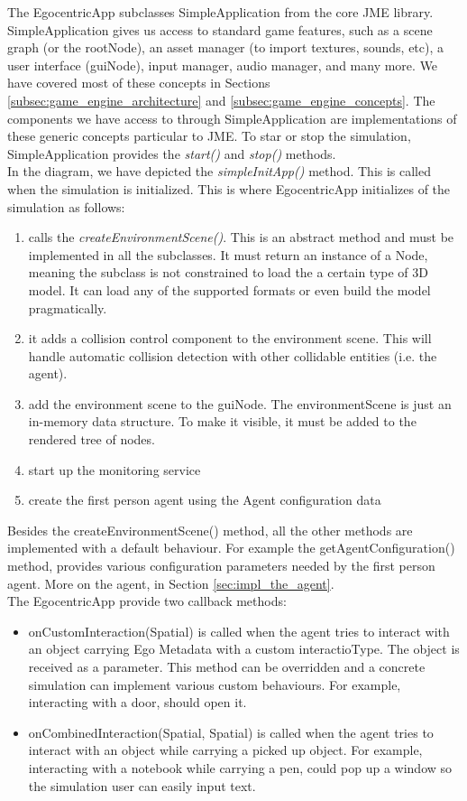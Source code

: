 The EgocentricApp subclasses SimpleApplication from the core JME library.  SimpleApplication  gives us access to standard game features, such as a scene graph (or the rootNode), an asset manager (to import textures, sounds, etc), a user interface (guiNode), input manager, audio manager, and many more. We have covered most of these concepts in Sections \ref{subsec:game_engine_architecture} and \ref{subsec:game_engine_concepts}. The components we have access to through SimpleApplication are implementations of these generic concepts particular to JME. To star or stop the simulation, SimpleApplication provides the \emph{start()} and \emph{stop()} methods.\\

In the diagram, we have depicted the \emph{simpleInitApp()} method. This is called when the simulation is initialized. This is where EgocentricApp initializes of the simulation as follows:
\begin{enumerate}
	\item calls the \emph{createEnvironmentScene()}. This is an abstract method and must be implemented in all the subclasses. It must return an instance of a Node, meaning the subclass is not constrained to load the a certain type of 3D model. It can load any of the supported formats or even build the model pragmatically.
	\item it adds a collision control component to the environment scene. This will handle automatic collision detection with other collidable entities (i.e. the agent).
	\item add the environment scene to the guiNode. The environmentScene is just an in-memory data structure. To make it visible, it must be added to the rendered tree of nodes.
	\item start up the monitoring service
	\item create the first person agent using the Agent configuration data 
\end{enumerate}

Besides the createEnvironmentScene() method, all the other methods are implemented with a default behaviour. For example the getAgentConfiguration() method, provides various configuration parameters needed by the first person agent. More on the agent, in Section \ref{sec:impl_the_agent}.\\

The EgocentricApp provide two callback methods:
\begin{itemize}
	\item onCustomInteraction(Spatial) is called when the agent tries to interact with an object carrying Ego Metadata with a custom interactioType. The object is received as a parameter. This method can be overridden and a concrete simulation can implement various custom behaviours. For example, interacting with a door, should open it.
	\item onCombinedInteraction(Spatial, Spatial) is called when the agent tries to interact with an object while carrying a picked up object. For example, interacting with a notebook while carrying a pen, could pop up a window so the simulation user can easily input text.
\end{itemize}

